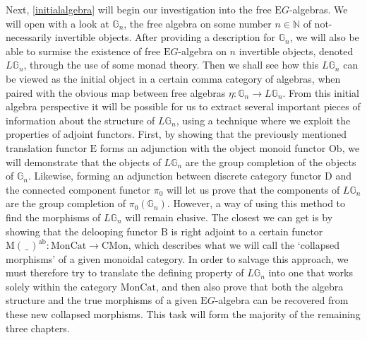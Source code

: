 Next, \cref{initialalgebra} will begin our investigation into the free $\mathrm{E}G$-algebras. We will open with a look at $\mathbb{G}_n$, the free algebra on some number $n \in \mathbb{N}$ of not-necessarily invertible objects. After providing a description for $\mathbb{G}_n$, we will also be able to surmise the existence of free $\mathrm{E}G$-algebra on $n$ invertible objects, denoted $L\mathbb{G}_n$, through the use of some monad theory. Then we shall see how this $L\mathbb{G}_n$ can be viewed as the initial object in a certain comma category of algebras, when paired with the obvious map between free algebras $\eta: \mathbb{G}_n \to L\mathbb{G}_n$. From this initial algebra perspective it will be possible for us to extract several important pieces of information about the structure of $L\mathbb{G}_n$, using a technique where we exploit the properties of adjoint functors. First, by showing that the previously mentioned translation functor $\mathrm{E}$ forms an adjunction with the object monoid functor $\mathrm{Ob}$, we will demonstrate that the objects of $L\mathbb{G}_n$ are the group completion of the objects of $\mathbb{G}_n$. Likewise, forming an adjunction between discrete category functor $\mathrm{D}$ and the connected component functor $\pi_0$ will let us prove that the components of $L\mathbb{G}_n$ are the group completion of $\pi_0(\mathbb{G}_n)$. However, a way of using this method to find the morphisms of $L\mathbb{G}_n$ will remain elusive. The closest we can get is by showing that the delooping functor $\mathrm{B}$ is right adjoint to a certain functor $\mathrm{M}( \, \_ \,)^{\mathrm{ab}} : \mathrm{MonCat} \to \mathrm{CMon}$, which describes what we will call the `collapsed morphisms' of a given monoidal category. In order to salvage this approach, we must therefore try to translate the defining property of $L\mathbb{G}_n$ into one that works solely within the category $\mathrm{MonCat}$, and then also prove that both the algebra structure and the true morphisms of a given $\mathrm{E}G$-algebra can be recovered from these new collapsed morphisms. This task will form the majority of the remaining three chapters. 

